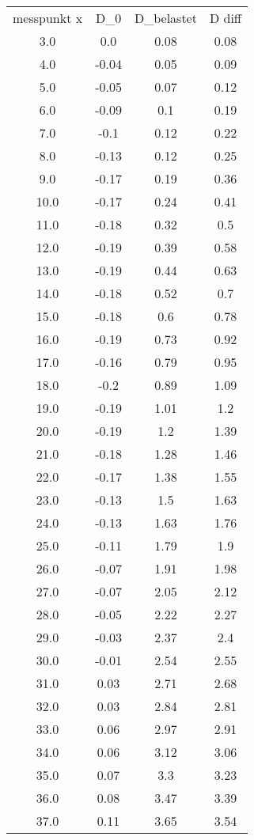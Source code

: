 \begin{table}
\begin{tabular}{cccc}
messpunkt x & D_0 & D_belastet & D diff \\
3.0 & 0.0 & 0.08 & 0.08 \\
4.0 & -0.04 & 0.05 & 0.09 \\
5.0 & -0.05 & 0.07 & 0.12 \\
6.0 & -0.09 & 0.1 & 0.19 \\
7.0 & -0.1 & 0.12 & 0.22 \\
8.0 & -0.13 & 0.12 & 0.25 \\
9.0 & -0.17 & 0.19 & 0.36 \\
10.0 & -0.17 & 0.24 & 0.41 \\
11.0 & -0.18 & 0.32 & 0.5 \\
12.0 & -0.19 & 0.39 & 0.58 \\
13.0 & -0.19 & 0.44 & 0.63 \\
14.0 & -0.18 & 0.52 & 0.7 \\
15.0 & -0.18 & 0.6 & 0.78 \\
16.0 & -0.19 & 0.73 & 0.92 \\
17.0 & -0.16 & 0.79 & 0.95 \\
18.0 & -0.2 & 0.89 & 1.09 \\
19.0 & -0.19 & 1.01 & 1.2 \\
20.0 & -0.19 & 1.2 & 1.39 \\
21.0 & -0.18 & 1.28 & 1.46 \\
22.0 & -0.17 & 1.38 & 1.55 \\
23.0 & -0.13 & 1.5 & 1.63 \\
24.0 & -0.13 & 1.63 & 1.76 \\
25.0 & -0.11 & 1.79 & 1.9 \\
26.0 & -0.07 & 1.91 & 1.98 \\
27.0 & -0.07 & 2.05 & 2.12 \\
28.0 & -0.05 & 2.22 & 2.27 \\
29.0 & -0.03 & 2.37 & 2.4 \\
30.0 & -0.01 & 2.54 & 2.55 \\
31.0 & 0.03 & 2.71 & 2.68 \\
32.0 & 0.03 & 2.84 & 2.81 \\
33.0 & 0.06 & 2.97 & 2.91 \\
34.0 & 0.06 & 3.12 & 3.06 \\
35.0 & 0.07 & 3.3 & 3.23 \\
36.0 & 0.08 & 3.47 & 3.39 \\
37.0 & 0.11 & 3.65 & 3.54 \\

\end{tabular}
\end{table}
